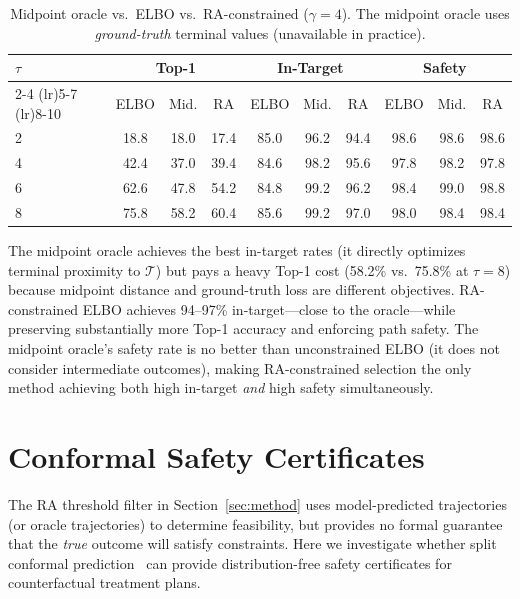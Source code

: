 \documentclass{article}
\newcommand{\cT}{\mathcal{T}}
\begin{document}
\begin{table}[h]
\centering
\caption{Midpoint oracle vs.\ ELBO vs.\ RA-constrained ($\gamma = 4$). The midpoint oracle uses \emph{ground-truth} terminal values (unavailable in practice).}
\label{tab:midpoint}
\small
\begin{tabular}{l c c c c c c c c c}
\toprule
$\tau$ & \multicolumn{3}{c}{Top-1} & \multicolumn{3}{c}{In-Target} & \multicolumn{3}{c}{Safety} \\
\cmidrule(lr){2-4} \cmidrule(lr){5-7} \cmidrule(lr){8-10}
 & ELBO & Mid. & RA & ELBO & Mid. & RA & ELBO & Mid. & RA \\
\midrule
2 & 18.8 & 18.0 & 17.4 & 85.0 & 96.2 & 94.4 & 98.6 & 98.6 & 98.6 \\
4 & 42.4 & 37.0 & 39.4 & 84.6 & 98.2 & 95.6 & 97.8 & 98.2 & 97.8 \\
6 & 62.6 & 47.8 & 54.2 & 84.8 & 99.2 & 96.2 & 98.4 & 99.0 & 98.8 \\
8 & 75.8 & 58.2 & 60.4 & 85.6 & 99.2 & 97.0 & 98.0 & 98.4 & 98.4 \\
\bottomrule
\end{tabular}
\end{table}

The midpoint oracle achieves the best in-target rates (it directly optimizes terminal proximity to $\cT$) but pays a heavy Top-1 cost (58.2\% vs.\ 75.8\% at $\tau = 8$) because midpoint distance and ground-truth loss are different objectives. RA-constrained ELBO achieves 94--97\% in-target---close to the oracle---while preserving substantially more Top-1 accuracy and enforcing path safety. The midpoint oracle's safety rate is no better than unconstrained ELBO (it does not consider intermediate outcomes), making RA-constrained selection the only method achieving both high in-target \emph{and} high safety simultaneously.


\section{Conformal Safety Certificates}
\label{app:conformal}

The RA threshold filter in Section~\ref{sec:method} uses model-predicted trajectories (or oracle trajectories) to determine feasibility, but provides no formal guarantee that the \emph{true} outcome will satisfy constraints. Here we investigate whether split conformal prediction~\citep{vovk2005algorithmic} can provide distribution-free safety certificates for counterfactual treatment plans.
\end{document}
